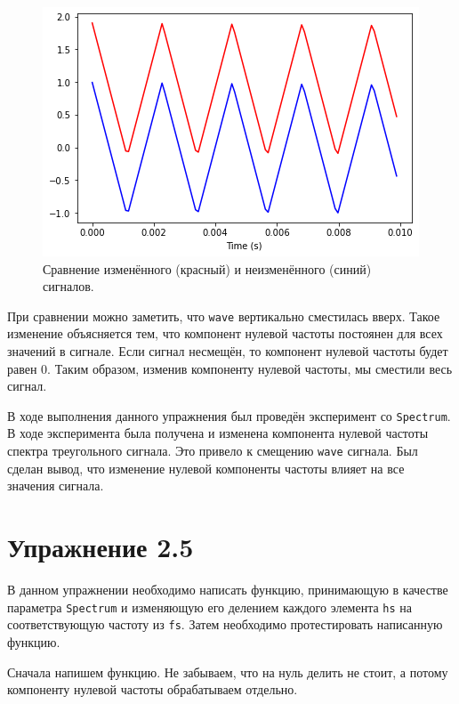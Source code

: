 \documentclass[a4paper, 14pt]{extarticle}
\begin{document}
    \begin{figure}[h]
        \centering
        \includegraphics[width=0.8\linewidth]{resources/Images/task4_compare_wave}
        \caption{Сравнение изменённого (красный) и неизменённого (синий) сигналов.}
        \label{fig:task4_compare_wave}
    \end{figure}

    При сравнении можно заметить, что \texttt{wave} вертикально сместилась вверх.
    Такое изменение объясняется тем, что компонент нулевой частоты постоянен для всех значений в сигнале.
    Если сигнал несмещён, то компонент нулевой частоты будет равен 0.
    Таким образом, изменив компоненту нулевой частоты, мы сместили весь сигнал.

    В ходе выполнения данного упражнения был проведён эксперимент со \texttt{Spectrum}.
    В ходе эксперимента была получена и изменена компонента нулевой частоты спектра треугольного сигнала.
    Это привело к смещению \texttt{wave} сигнала. Был сделан вывод, что изменение нулевой компоненты частоты
    влияет на все значения сигнала.

    \newpage

    \section{Упражнение 2.5}
    \label{sec:task5}

    В данном упражнении необходимо написать функцию, принимающую в качестве параметра \texttt{Spectrum} и изменяющую его
    делением каждого элемента \texttt{hs} на соответствующую частоту из \texttt{fs}. Затем необходимо протестировать написанную функцию.

    Сначала напишем функцию. Не забываем, что на нуль делить не стоит, а потому компоненту нулевой частоты обрабатываем отдельно.
\end{document}
